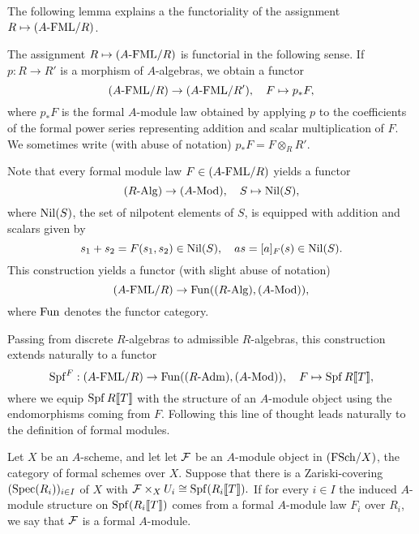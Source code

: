 \documentclass[../main.tex]{subfiles}
\begin{document}
The following lemma explains a the functoriality of the assignment
$R \mapsto {({A}\text-\mathrm{FML}/{R})}$.

\begin{lem}\label{lem:FMLFunc}
  The assignment $R \mapsto {({A}\text-\mathrm{FML}/{R})}$ is functorial in the following sense.
  If $p: R \to R'$ is a morphism of $A$-algebras, we obtain a functor
  \begin{equation*}
    {({A}\text-\mathrm{FML}/{R})} \to {({A}\text-\mathrm{FML}/{R'})}, \quad F \mapsto p_*F,
  \end{equation*}
  where $p_*F$ is the formal $A$-module law obtained by applying $p$ to the
  coefficients of the formal power series representing addition
  and scalar multiplication of $F$. We sometimes write
  (with abuse of notation) $p_* F = F \otimes_R R'$. 
\end{lem}

Note that every formal module law $F \in {({A}\text-\mathrm{FML}/{R})}$ yields a functor
\begin{equation}\label{eq:fmnilpfunc}
  {({R}\text-\mathrm{Alg})} \to {({A}\text-\mathrm{Mod})}, \quad S \mapsto {\operatorname{Nil}}(S),
\end{equation}
where ${\operatorname{Nil}}(S)$, the set of nilpotent elements of $S$, is equipped with
addition and scalars given by 
\begin{equation*}
  s_1 + s_2 = F(s_1, s_2) \in {\operatorname{Nil}}(S), \quad a s = [a]_F(s) \in {\operatorname{Nil}}(S).
\end{equation*}
This construction yields a functor (with slight abuse of notation)
\begin{equation}\label{eq:formfunc}
  {({A}\text-\mathrm{FML}/{R})} \to \operatorname{Fun}({({R}\text-\mathrm{Alg})}, {({A}\text-\mathrm{Mod})}),
\end{equation}
where $\operatorname{Fun}$ denotes the functor category.

Passing from discrete $R$-algebras to admissible $R$-algebras, this construction extends
naturally to a functor 
\begin{equation*}
  \operatorname{Spf}^F: {({A}\text-\mathrm{FML}/{R})} \to \operatorname{Fun} ({({R}\text-\mathrm{Adm})}, {({A}\text-\mathrm{Mod})}), \quad F \mapsto \operatorname{Spf} R\llbracket T \rrbracket,
\end{equation*}
where we equip $\operatorname{Spf} R \llbracket T \rrbracket$ with the structure of an $A$-module object
using the endomorphisms coming from $F$. 
Following this line of thought leads naturally to the definition of
formal modules. 

\begin{defi}
  Let $X$ be an $A$-scheme, and let 
  let $\mathcal{F}$ be an $A$-module object in ${(\mathrm{FSch}/{X})}$, the category of formal
  schemes over $X$. Suppose that there is a Zariski-covering
  $(\operatorname{Spec}(R_i))_{i \in I}$ of $X$ with $\mathcal{F} \times_{X} U_i \cong
  \operatorname{Spf}(R_i\llbracket T \rrbracket).$ If for every $i\in I$ the induced $A$-module
  structure on $\operatorname{Spf}(R_i\llbracket T \rrbracket)$ comes from a formal $A$-module law
  $F_i$ over $R_i$, we say that $\mathcal{F}$ is a formal $A$-module. 
\end{defi}
\end{document}
